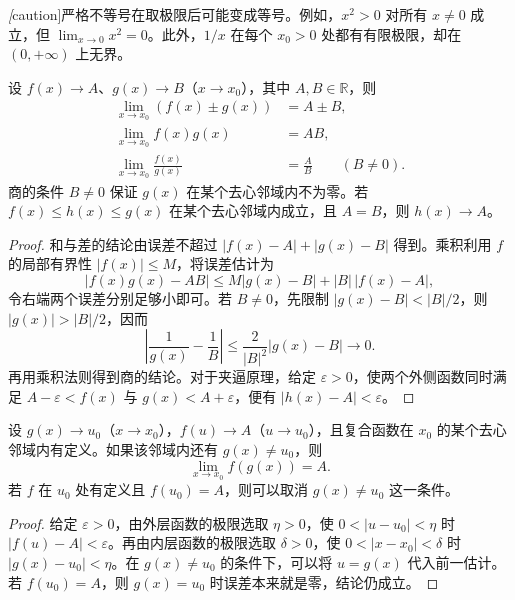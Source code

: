 \emph[caution]{严格不等号在取极限后可能变成等号。}例如，$x^2>0$ 对所有 $x\neq0$ 成立，但 $\lim_{x\to0}x^2=0$。此外，$1/x$ 在每个 $x_0>0$ 处都有有限极限，却在 $(0,+\infty)$ 上无界。

\begin{theorem}[四则运算与夹逼原理]
\label{thm:function-limit-arithmetic-and-squeeze}
设 $f(x)\to A$、$g(x)\to B$（$x\to x_0$），其中 $A,B\in\mathbb{R}$，则
\begin{equation}
    \begin{aligned}
        \lim_{x\to x_0}(f(x)\pm g(x))&=A\pm B,\\
        \lim_{x\to x_0}f(x)g(x)&=AB,\\
        \lim_{x\to x_0}\frac{f(x)}{g(x)}&=\frac AB\qquad(B\neq0).
    \end{aligned}
    \label{eq:function-limit-arithmetic}
\end{equation}
商的条件 $B\neq0$ 保证 $g(x)$ 在某个去心邻域内不为零。若 $f(x)\leq h(x)\leq g(x)$ 在某个去心邻域内成立，且 $A=B$，则 $h(x)\to A$。
\end{theorem}

\begin{proof}
和与差的结论由误差不超过 $|f(x)-A|+|g(x)-B|$ 得到。乘积利用 $f$ 的局部有界性 $|f(x)|\leq M$，将误差估计为
\[
    |f(x)g(x)-AB|\leq M|g(x)-B|+|B|\,|f(x)-A|,
\]
令右端两个误差分别足够小即可。若 $B\neq0$，先限制 $|g(x)-B|<|B|/2$，则 $|g(x)|>|B|/2$，因而
\[
    \left|\frac1{g(x)}-\frac1B\right|
    \leq\frac{2}{|B|^2}|g(x)-B|\to0.
\]
再用乘积法则得到商的结论。对于夹逼原理，给定 $\varepsilon>0$，使两个外侧函数同时满足 $A-\varepsilon<f(x)$ 与 $g(x)<A+\varepsilon$，便有 $|h(x)-A|<\varepsilon$。
\end{proof}

\begin{theorem}[复合函数的极限]
\label{thm:composition-of-function-limits}
设 $g(x)\to u_0$（$x\to x_0$），$f(u)\to A$（$u\to u_0$），且复合函数在 $x_0$ 的某个去心邻域内有定义。如果该邻域内还有 $g(x)\neq u_0$，则
\begin{equation}
    \lim_{x\to x_0}f(g(x))=A.
    \label{eq:composition-of-function-limits}
\end{equation}
若 $f$ 在 $u_0$ 处有定义且 $f(u_0)=A$，则可以取消 $g(x)\neq u_0$ 这一条件。
\end{theorem}

\begin{proof}
给定 $\varepsilon>0$，由外层函数的极限选取 $\eta>0$，使 $0<|u-u_0|<\eta$ 时 $|f(u)-A|<\varepsilon$。再由内层函数的极限选取 $\delta>0$，使 $0<|x-x_0|<\delta$ 时 $|g(x)-u_0|<\eta$。在 $g(x)\neq u_0$ 的条件下，可以将 $u=g(x)$ 代入前一估计。若 $f(u_0)=A$，则 $g(x)=u_0$ 时误差本来就是零，结论仍成立。
\end{proof}

